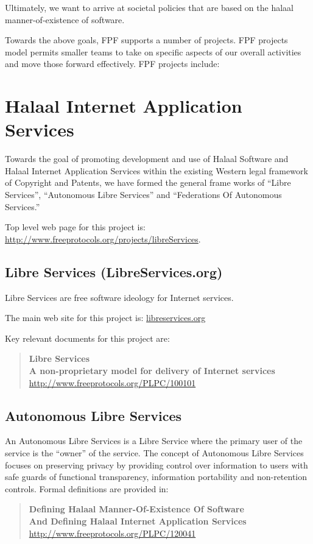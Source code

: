 Ultimately, we want to arrive at societal policies that are based on the halaal
manner-of-existence of software.

Towards the above goals, FPF supports a number of projects.  FPF projects model permits
smaller teams to take on specific aspects of our overall activities and move those forward
effectively.  FPF projects include:

\tableofcontents


\section{Halaal Internet Application Services}

Towards the goal of promoting development and use of Halaal Software and Halaal Internet
Application Services within the existing Western legal framework of Copyright and Patents,
we have formed the general frame works of ``Libre Services'', ``Autonomous Libre Services'' and 
``Federations Of Autonomous Services.''

Top level web page for this project is: \href{http://www.freeprotocols.org/projects/libreServices}{http://www.freeprotocols.org/projects/libreServices}.

\subsection{Libre Services (LibreServices.org)}

Libre Services are free software ideology for Internet services.

The main web site for this project is:
\href{http://www.libreservices.org}{libreservices.org}

Key relevant documents for this project are:

\begin{quote}
  \textbf{Libre Services}\\
  \textbf{A non-proprietary model for delivery of Internet services}\\
  \href{http://www.freeprotocols.org/PLPC/100101}{http://www.freeprotocols.org/PLPC/100101}
\end{quote}

\subsection{Autonomous Libre Services}

An Autonomous Libre Services is a Libre Service where the primary user of the service is
the ``owner'' of the service. 
The concept of Autonomous Libre Services focuses on preserving
privacy by providing control over information to users with safe guards of
functional transparency, information portability and non-retention controls.
Formal definitions are provided in:
\begin{quote}
  \textbf{Defining Halaal Manner-Of-Existence Of Software}\\
  \textbf{And Defining Halaal Internet Application Services}\\
  \href{http://www.freeprotocols.org/PLPC/120041}{http://www.freeprotocols.org/PLPC/120041}
\end{quote}

